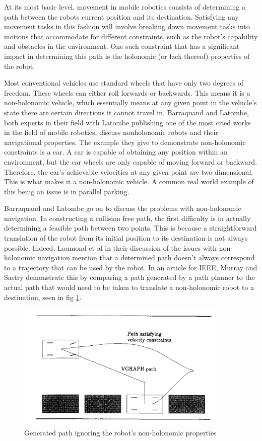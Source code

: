 			At its most basic level, movement in mobile robotics consists of determining a path between the robots current position and its destination. Satisfying any movement tasks in this fashion will involve breaking down movement tasks into motions that accommodate for different constraints, such as the robot's capability and obstacles in the environment. One such constraint that has a significant impact in determining this path is the holonomic (or lack thereof) properties of the robot.
			
			Most conventional vehicles use standard wheels that have only two degrees of freedom. These wheels can either roll forwards or backwards. This means it is a non-holonomic vehicle, which essentially means at any given point in the vehicle's state there are certain directions it cannot travel in. Barraquand and Latombe\citep{barraquand1989nonholonomic}, both experts in their field with Latombe publishing one of the most cited works in the field of mobile robotics, discuss nonholonomic robots and their navigational properties. The example they give to demonstrate non-holonomic constraints is a car. A car is capable of obtaining any position within an environment, but the car wheels are only capable of moving forward or backward. Therefore, the car's achievable velocities at any given point are two dimensional. This is what makes it a non-holonomic vehicle. A common real world example of this being an issue is in parallel parking.
			
			Barraquand and Latombe go on to discuss the problems with non-holonomic navigation. In constructing a collision free path, the first difficulty is in actually determining a feasible path between two points. This is because a straightforward translation of the robot from its initial position to its destination is not always possible. Indeed, Laumond et al\citep{laumond1994motion} in their discussion of the issues with non-holonomic navigation mention that a determined path doesn't always correspond to a trajectory that can be used by the robot. In an article for IEEE, Murray and Sastry\citep{murray1993nonholonomic} demonstrate this by comparing a path generated by a path planner to the actual path that would need to be taken to translate a non-holonomic robot to a destination, seen in fig \ref{fig:generatedpathfailure}.
			
			\begin{figure}[h]
				\centering
				\includegraphics[scale=0.9]{ANALYSIS/generatedpathfailure.png}
				\caption{Generated path ignoring the robot's non-holonomic properties}
				\label{fig:generatedpathfailure}
			\end{figure}
			
